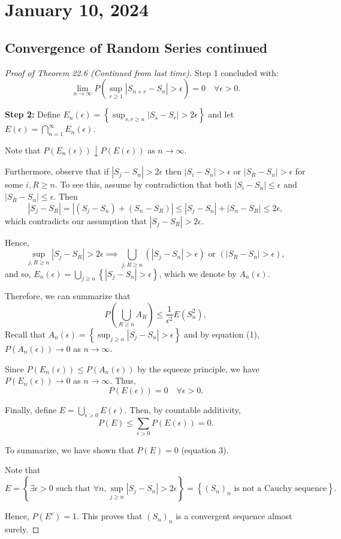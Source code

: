 \newpage
\section{January 10, 2024}

\subsection{Convergence of Random Series continued}
\begin{proof}[Proof of Theorem 22.6 (Continued from last time)]
Step 1 concluded with:
\[
\lim_{n \to \infty} P\left(\sup_{r \geq 1} |S_{n+r} - S_n| > \epsilon\right) = 0 \quad \forall \epsilon > 0. \tag{1}
\]

\textbf{Step 2:} Define $E_n(\epsilon) = \left\{ \sup_{s, r \geq n} |S_s - S_r| > 2\epsilon \right\}$ and let $E(\epsilon) = \bigcap_{n=1}^\infty E_n(\epsilon)$.

Note that $P(E_n(\epsilon)) \downarrow P(E(\epsilon))$ as $n \to \infty$. 

Furthermore, observe that if $|S_j - S_n| > 2\epsilon$ then $|S_i - S_n| > \epsilon$ or $|S_R - S_n| > \epsilon$ for some $i, R \geq n$. To see this, assume by contradiction that both $|S_i - S_n| \leq \epsilon$ and $|S_R - S_n| \leq \epsilon$. Then
\[
|S_j - S_R| = |(S_j - S_n) + (S_n - S_R)| \leq |S_j - S_n| + |S_n - S_R| \leq 2\epsilon,
\]
which contradicts our assumption that $|S_j - S_R| > 2\epsilon$.

Hence,
\[
\sup_{j, R \geq n} |S_j - S_R| > 2\epsilon \implies \bigcup_{j, R \geq n} \left( |S_j - S_n| > \epsilon \right) \text{ or } \left( |S_R - S_n| > \epsilon \right),
\]
and so, $E_n(\epsilon) = \bigcup_{j \geq n} \left\{ |S_j - S_n| > \epsilon \right\}$, which we denote by $A_n(\epsilon)$.

Therefore, we can summarize that
\[
P\left(\bigcup_{R \geq n} A_R \right) \leq \frac{1}{\epsilon^2} E(S_n^2),
\]
Recall that $A_n(\epsilon) = \left\{\sup_{j \geq n} |S_j - S_n| > \epsilon \right\}$ and by equation (1), $P(A_n(\epsilon)) \to 0$ as $n \to \infty$.

Since $P(E_n(\epsilon)) \leq P(A_n(\epsilon))$ by the squeeze principle, we have $P(E_n(\epsilon)) \to 0$ as $n \to \infty$. Thus,
\[
P(E(\epsilon)) = 0 \quad \forall \epsilon > 0. \tag{3}
\]

Finally, define $E = \bigcup_{\epsilon > 0} E(\epsilon)$. Then, by countable additivity,
\[
P(E) \leq \sum_{\epsilon > 0} P(E(\epsilon)) = 0.
\]

To summarize, we have shown that $P(E) = 0$ (equation 3).

Note that
\[
E = \left\{\exists \epsilon > 0 \text{ such that } \forall n, \sup_{j \geq n} |S_j - S_n| > 2\epsilon \right\} = \left\{(S_n)_n \text{ is not a Cauchy sequence} \right\}.
\]

Hence, $P(E^c) = 1$. This proves that $(S_n)_n$ is a convergent sequence almost surely.
\end{proof}

